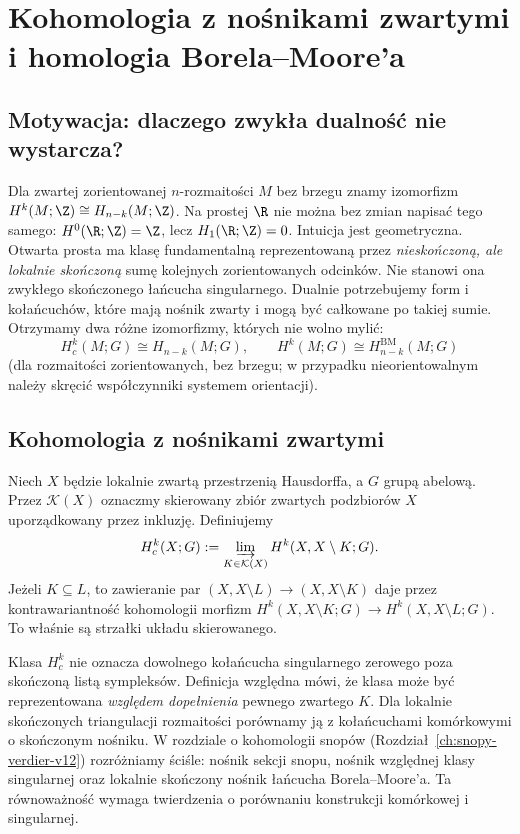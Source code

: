 \chapter{Kohomologia z nośnikami zwartymi i homologia Borela--Moore'a}
\label{ch:compact-bm-v11}

\section{Motywacja: dlaczego zwykła dualność nie wystarcza?}
Dla zwartej zorientowanej $n$-rozmaitości $M$ bez brzegu znamy izomorfizm
$H^k(M;\Z)\cong H_{n-k}(M;\Z)$. Na prostej $\R$ nie można
bez zmian napisać tego samego: $H^0(\R;\Z)=\Z$, lecz
$H_1(\R;\Z)=0$. Intuicja jest geometryczna.
Otwarta prosta ma klasę fundamentalną reprezentowaną przez
\emph{nieskończoną, ale lokalnie skończoną} sumę kolejnych
zorientowanych odcinków. Nie stanowi ona zwykłego skończonego
łańcucha singularnego. Dualnie potrzebujemy form i kołańcuchów,
które mają nośnik zwarty i mogą być całkowane po takiej sumie.
Otrzymamy dwa różne izomorfizmy, których nie wolno mylić:
\[
H_c^k(M;G)\cong H_{n-k}(M;G),\qquad
H^k(M;G)\cong H_{n-k}^{\mathrm{BM}}(M;G)
\]
(dla rozmaitości zorientowanych, bez brzegu; w przypadku
nieorientowalnym należy skręcić współczynniki systemem orientacji).

\section{Kohomologia z nośnikami zwartymi}
\begin{definicja}
\label{def:compact-support-cohom-v11}
Niech $X$ będzie lokalnie zwartą przestrzenią Hausdorffa,
a $G$ grupą abelową. Przez $\mathcal K(X)$ oznaczmy
skierowany zbiór zwartych podzbiorów $X$ uporządkowany
przez inkluzję. Definiujemy
\[
H_c^k(X;G):=\varinjlim_{K\in\mathcal K(X)}
H^k(X,X\setminus K;G).
\]
Jeżeli $K\subseteq L$, to zawieranie par
$(X,X\setminus L)\to(X,X\setminus K)$ daje przez
kontrawariantność kohomologii morfizm
$H^k(X,X\setminus K;G)\to H^k(X,X\setminus L;G)$.
To właśnie są strzałki układu skierowanego.
\end{definicja}

\begin{uwaga}
Klasa $H_c^k$ nie oznacza dowolnego kołańcucha singularnego
zerowego poza skończoną listą sympleksów. Definicja względna
mówi, że klasa może być reprezentowana \emph{względem dopełnienia}
pewnego zwartego $K$. Dla lokalnie skończonych triangulacji
rozmaitości porównamy ją z kołańcuchami komórkowymi o skończonym
nośniku. W rozdziale o kohomologii snopów (Rozdział~\ref{ch:snopy-verdier-v12}) rozróżniamy
ściśle: nośnik sekcji snopu, nośnik względnej klasy
singularnej oraz lokalnie skończony nośnik łańcucha Borela--Moore'a. Ta równoważność wymaga twierdzenia o porównaniu
konstrukcji komórkowej i singularnej.
\end{uwaga}

